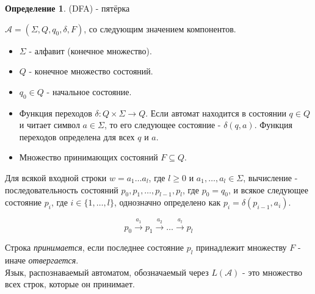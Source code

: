 \documentclass[a4paper]{article}
\theoremstyle{indented}
\theoremstyle{definition}
\newtheorem{defn}{Определение}
\theoremstyle{remark}
\DeclareMathOperator{\ra}{\rightarrow}
\begin{document}
\begin{defn}
     (DFA) - пятёрка  \ 

    $\mathcal{A} = (\Sigma, Q, q_0, \delta, F )$, со следующим значением компонентов.

    \begin{itemize}
        \item $\Sigma$ - алфавит (конечное множество).
        \item $Q$ - конечное множество состояний.
        \item $q_0 \in Q$ - начальное состояние.
        \item Функция переходов $\delta : Q \times \Sigma \ra Q$. Если автомат находится в состоянии $q \in Q$ и читает символ $a \in \Sigma$, то его следующее состояние - $\delta(q,a)$. Функция переходов определена для всех $q$ и $a$.
        \item Множество принимающих состояний $F \subseteq Q$.
    \end{itemize}

    Для всякой входной строки $w = a_1 \ldots a_l$, где $l \geq 0$ и $a_1, \ldots ,a_l \in \Sigma$, вычисление - последовательность состояний $p_0, p_1, \ldots , p_{l-1}, p_l$, где $p_0 = q_0$, и всякое следующее состояние $p_i$, где $i \in \{1, \ldots, l\}$, однозначно определено как $p_i = \delta(p_{i-1}, a_i)$.

    \[
        p_0 \xrightarrow{a_1} p_1 \xrightarrow{a_2} \ldots \xrightarrow{a_l} p_l
    \]

    Строка \textit{принимается}, если последнее состояние $p_l$ принадлежит множеству $F$ - иначе \textit{отвергается}. \\ 

    Язык, распознаваемый автоматом, обозначаемый через $L(\mathcal{A})$ - это множество всех строк, которые он принимает.
\end{defn}
\end{document}
